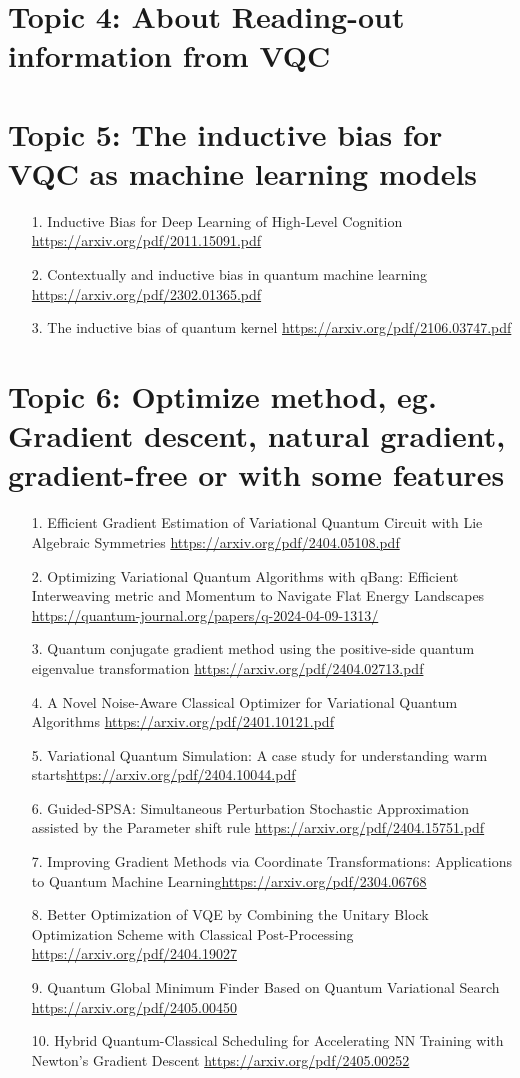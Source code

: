 \documentclass[12pt, oneside]{article}   	%
\begin{document}
\section{Topic 4: About Reading-out information  from VQC}

\section{Topic 5: The inductive bias for VQC as machine learning models}
\begin{itemize}
\item[1. ] Inductive Bias for Deep Learning of High-Level Cognition \url{https://arxiv.org/pdf/2011.15091.pdf}
\item[2. ] Contextually and inductive bias in quantum machine learning \url{https://arxiv.org/pdf/2302.01365.pdf}
\item[3. ] The inductive bias of quantum kernel \url{https://arxiv.org/pdf/2106.03747.pdf}
\end{itemize}

\section{Topic 6: Optimize method, eg. Gradient descent, natural gradient, gradient-free or with some features}
\begin{itemize}
\item[1. ] Efficient Gradient Estimation of Variational Quantum Circuit with Lie Algebraic Symmetries \url{https://arxiv.org/pdf/2404.05108.pdf}
\item[2. ] Optimizing Variational Quantum Algorithms with qBang: Efficient Interweaving metric and Momentum to Navigate Flat Energy Landscapes \url{https://quantum-journal.org/papers/q-2024-04-09-1313/}
\item[3. ] Quantum conjugate gradient method using the positive-side quantum eigenvalue transformation \url{https://arxiv.org/pdf/2404.02713.pdf}
\item [4. ] A Novel Noise-Aware Classical Optimizer for Variational Quantum Algorithms \url{https://arxiv.org/pdf/2401.10121.pdf}
\item[5. ] Variational Quantum Simulation: A case study for understanding warm starts\url{https://arxiv.org/pdf/2404.10044.pdf}
\item[6. ] Guided-SPSA: Simultaneous Perturbation Stochastic Approximation assisted by the Parameter shift rule \url{https://arxiv.org/pdf/2404.15751.pdf}
\item[7. ] Improving Gradient Methods via Coordinate Transformations: Applications to Quantum Machine Learning\url{https://arxiv.org/pdf/2304.06768}
\item[8. ] Better Optimization of VQE by Combining the Unitary Block Optimization Scheme with Classical Post-Processing \url{https://arxiv.org/pdf/2404.19027} 
\item[9. ] Quantum Global Minimum Finder Based on Quantum Variational Search \url{https://arxiv.org/pdf/2405.00450} 
\item[10. ] Hybrid Quantum-Classical Scheduling for Accelerating NN Training with Newton's Gradient Descent \url{https://arxiv.org/pdf/2405.00252}
\end{itemize}
\end{document}
